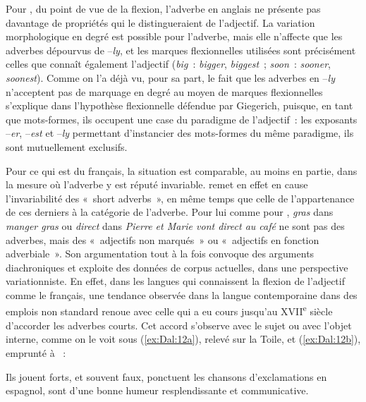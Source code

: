 \documentclass[output=paper]{langsci/langscibook}
\begin{document}
Pour %
\citet{Giegerich12}%
%
, du point de vue de la flexion, l'adverbe en anglais ne présente pas davantage de propriétés qui le distingueraient de l'adjectif. La variation morphologique en degré est possible pour l'adverbe, mais elle n'affecte que les adverbes dépourvus de --\emph{ly}, et les marques flexionnelles utilisées sont précisément celles que connaît également l'adjectif (\emph{big~}: \emph{bigger}, \emph{biggest}~; \emph{soon~}: \emph{sooner}, \emph{soonest}). Comme on l'a déjà vu, pour sa part, le fait que les adverbes en --\emph{ly} n'acceptent pas de marquage en degré au moyen de marques flexionnelles s'explique dans l'hypothèse flexionnelle défendue par Giegerich, puisque, en tant que mots-formes, ils occupent une case du paradigme de l'adjectif~: les exposants --\emph{er}, --\emph{est} et --\emph{ly} permettant d'instancier des mots-formes du même paradigme, ils sont mutuellement exclusifs.

Pour ce qui est du français, la situation est comparable, au moins en partie, dans la mesure où l'adverbe y est réputé invariable. %
\citet{Hummel13,Hummel14} %
%
remet en effet en cause l'invariabilité des «~short adverbs~», en même temps que celle de l'appartenance de ces derniers à la catégorie de l'adverbe. Pour lui comme pour %
\citet{Abeille04}%
%
, \emph{gras} dans \emph{manger gras} ou \emph{direct} dans \emph{Pierre et Marie vont direct au café} ne sont pas des adverbes, mais des «~adjectifs non marqués~» ou «~adjectifs en fonction adverbiale~». Son argumentation tout à la fois convoque des arguments diachroniques et exploite des données de corpus actuelles, dans une perspective variationniste. En effet, dans les langues qui connaissent la flexion de l'adjectif comme le français, une tendance observée dans la langue contemporaine dans des emplois non standard renoue avec celle qui a eu cours jusqu'au XVII\textsuperscript{e} siècle d'accorder les adverbes courts. Cet accord s'observe avec le sujet ou avec l'objet interne, comme on le voit sous (\ref{ex:Dal:12a}), relevé sur la Toile, et (\ref{ex:Dal:12b}), emprunté à %
\citet{Hummel14b}%
%
~:\newpage 

\ea\label{ex:Dal:12}
    \ea\label{ex:Dal:12a} Ils jouent forts, et souvent faux, ponctuent les chansons d'exclamations en espagnol, sont d'une bonne humeur resplendissante et communicative.
\end{document}
